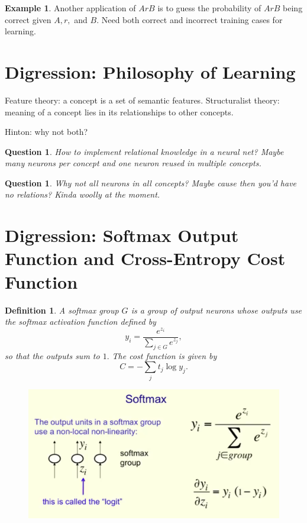 \documentclass[12pt]{article}
\theoremstyle{plain}
\newtheorem{question}[theorem]{Question}
\newtheorem{definition}[theorem]{Definition}
\theoremstyle{definition}
\newtheorem{example}[theorem]{Example}
\theoremstyle{remark}
\begin{document}
\begin{example}
Another application of $ArB$ is to guess the probability of $ArB$ being correct given $A, r,$ and $B.$ Need both correct and incorrect training cases for learning.
\end{example}

\section{Digression: Philosophy of Learning}

Feature theory: a concept is a set of semantic features. Structuralist theory: meaning of a concept lies in its relationships to other concepts. 

Hinton: why not both?

\begin{question}
How to implement relational knowledge in a neural net? Maybe many neurons per concept and one neuron reused in multiple concepts.
\end{question}

\begin{question}
Why not all neurons in all concepts? Maybe cause then you'd have no relations? Kinda woolly at the moment.
\end{question}

\section{Digression: Softmax Output Function and Cross-Entropy Cost Function}

\begin{definition}
A softmax group $G$ is a group of output neurons whose outputs use the softmax activation function defined by $$y_i = \frac{e^{z_i}}{\sum\limits_{j\in G} e^{z_j}},$$ so that the outputs sum to $1.$ The cost function is given by $$C = - \sum_j t_j \log y_j.$$
\end{definition}

\begin{figure}[H]
\centering
\includegraphics[width=1.0\textwidth]{softmaxgroup}
\end{figure}
\end{document}

